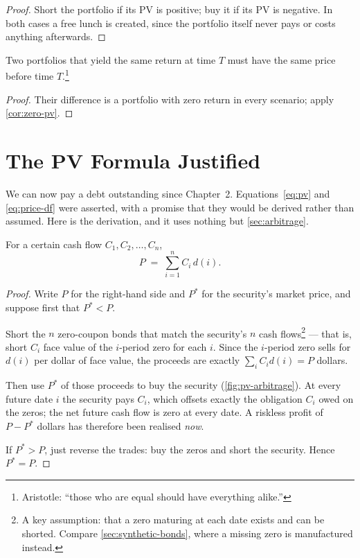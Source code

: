 \begin{proof}
	Short the portfolio if its PV is positive; buy it if its PV is negative.
	In both cases a free lunch is created, since the portfolio itself never pays or costs anything afterwards.
\end{proof}

\begin{corollary}
	\label{cor:same-payoff}
	Two portfolios that yield the same return at time $T$ must have the same price before time $T$.\footnote{Aristotle: ``those who are equal should have everything alike.''}
\end{corollary}

\suppstart
\begin{proof}
	Their difference is a portfolio with zero return in every scenario; apply \autoref{cor:zero-pv}.
\end{proof}
\suppend

\section{The PV Formula Justified}
\label{sec:pv-justified}


\suppstart
We can now pay a debt outstanding since Chapter~2.
Equations~\eqref{eq:pv} and \eqref{eq:price-df} were asserted, with a promise that they would be derived rather than assumed.
Here is the derivation, and it uses nothing but \autoref{sec:arbitrage}.
\suppend

\begin{theorem}
	\label{thm:pv-justified}
	For a certain cash flow $C_{1},C_{2},\ldots,C_{n}$,
	\[
		P \;=\; \sum_{i=1}^{n} C_{i}\,d(i) .
	\]
\end{theorem}

\begin{proof}
	Write $P$ for the right-hand side and $P^{*}$ for the security's market price, and suppose first that $P^{*}<P$.

	Short the $n$ zero-coupon bonds that match the security's $n$ cash flows\footnote{A key assumption: that a zero maturing at each date exists and can be shorted. Compare \autoref{sec:synthetic-bonds}, where a missing zero is manufactured instead.} --- that is, short $C_{i}$ face value of the $i$-period zero for each $i$.
	Since the $i$-period zero sells for $d(i)$ per dollar of face value, the proceeds are exactly $\sum_{i}C_{i}d(i)=P$ dollars.

	Then use $P^{*}$ of those proceeds to buy the security (\autoref{fig:pv-arbitrage}).
	At every future date $i$ the security pays $C_{i}$, which offsets exactly the obligation $C_{i}$ owed on the zeros; the net future cash flow is zero at every date.
	A riskless profit of $P-P^{*}$ dollars has therefore been realised \emph{now}.

	If $P^{*}>P$, just reverse the trades: buy the zeros and short the security.
	Hence $P^{*}=P$.
\end{proof}

